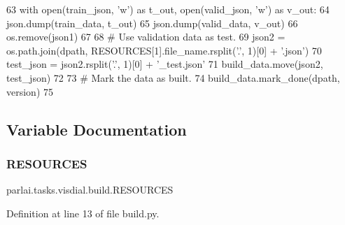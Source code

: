 \begin{DoxyCode}
63         with open(train\_json, \textcolor{stringliteral}{'w'}) \textcolor{keyword}{as} t\_out, open(valid\_json, \textcolor{stringliteral}{'w'}) \textcolor{keyword}{as} v\_out:
64             json.dump(train\_data, t\_out)
65             json.dump(valid\_data, v\_out)
66         os.remove(json1)
67 
68         \textcolor{comment}{# Use validation data as test.}
69         json2 = os.path.join(dpath, RESOURCES[1].file\_name.rsplit(\textcolor{stringliteral}{'.'}, 1)[0] + \textcolor{stringliteral}{'.json'})
70         test\_json = json2.rsplit(\textcolor{stringliteral}{'.'}, 1)[0] + \textcolor{stringliteral}{'\_test.json'}
71         build\_data.move(json2, test\_json)
72 
73         \textcolor{comment}{# Mark the data as built.}
74         build\_data.mark\_done(dpath, version)
75 \end{DoxyCode}


\subsection{Variable Documentation}
\mbox{\label{namespaceparlai_1_1tasks_1_1visdial_1_1build_a4c7aca51f877fb6b3dc05ec99dd6eb72}} 
\subsubsection{\texorpdfstring{R\+E\+S\+O\+U\+R\+C\+ES}{RESOURCES}}
{\footnotesize\ttfamily parlai.\+tasks.\+visdial.\+build.\+R\+E\+S\+O\+U\+R\+C\+ES}



Definition at line 13 of file build.\+py.


